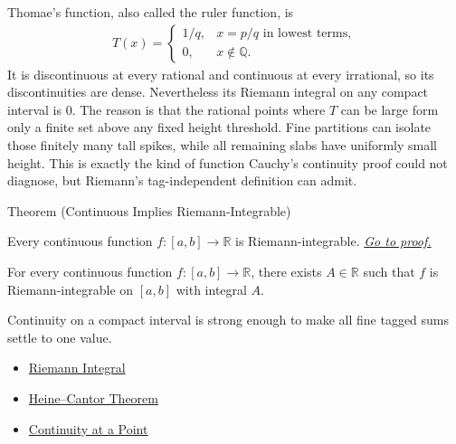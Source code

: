 \begin{remark*}[Interpretation]
Thomae's function, also called the ruler function, is
\[
\begin{aligned}
  T(x)=
  \begin{cases}
    1/q,& x=p/q\text{ in lowest terms},\\
    0,& x\notin\mathbb Q.
  \end{cases}
\end{aligned}
\]
It is discontinuous at every rational and continuous at every irrational, so
its discontinuities are dense. Nevertheless its Riemann integral on any compact
interval is \(0\). The reason is that the rational points where \(T\) can be
large form only a finite set above any fixed height threshold. Fine partitions
can isolate those finitely many tall spikes, while all remaining slabs have
uniformly small height. This is exactly the kind of function Cauchy's
continuity proof could not diagnose, but Riemann's tag-independent definition
can admit.
\end{remark*}

\begin{theorembox}{Theorem (Continuous Implies Riemann-Integrable)}
\begin{theorem}
\label{thm:continuous-riemann-integrable}
Every continuous function \(f:[a,b]\to\mathbb R\) is Riemann-integrable.
\hyperref[prf:continuous-riemann-integrable]{\textit{Go to proof.}}
\end{theorem}
\end{theorembox}

\begin{remark*}
For every continuous function \(f:[a,b]\to\mathbb R\), there exists
\(A\in\mathbb R\) such that \(f\) is Riemann-integrable on \([a,b]\) with
integral \(A\).
\end{remark*}

\begin{remark*}[Interpretation]
Continuity on a compact interval is strong enough to make all fine tagged
sums settle to one value.
\end{remark*}

\begin{dependencies}
\begin{itemize}
  \item \hyperref[def:riemann-integral]{Riemann Integral}
  \item \hyperref[thm:heine-cantor]{Heine--Cantor Theorem}
  \item \hyperref[def:continuous-at-point]{Continuity at a Point}
\end{itemize}
\end{dependencies}


